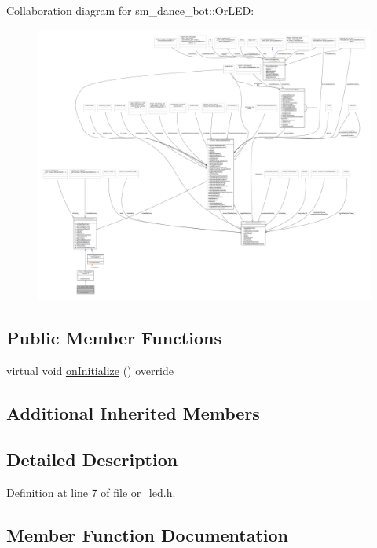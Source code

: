 Collaboration diagram for sm\+\_\+dance\+\_\+bot\+:\+:Or\+L\+ED\+:
\nopagebreak
\begin{figure}[H]
\begin{center}
\leavevmode
\includegraphics[width=350pt]{classsm__dance__bot_1_1OrLED__coll__graph}
\end{center}
\end{figure}
\subsection*{Public Member Functions}
\begin{DoxyCompactItemize}
\item 
virtual void \hyperlink{classsm__dance__bot_1_1OrLED_a5073f6147253e88531b3d9a10bd1df49}{on\+Initialize} () override
\end{DoxyCompactItemize}
\subsection*{Additional Inherited Members}


\subsection{Detailed Description}


Definition at line 7 of file or\+\_\+led.\+h.



\subsection{Member Function Documentation}
\mbox{\label{classsm__dance__bot_1_1OrLED_a5073f6147253e88531b3d9a10bd1df49}} 

